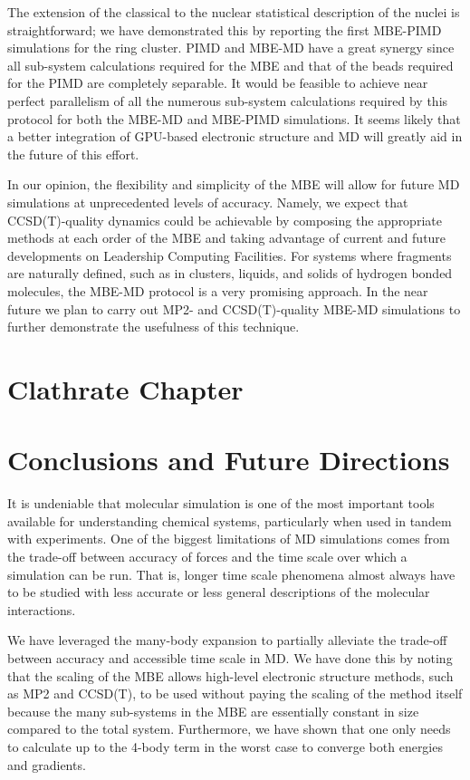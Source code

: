 \documentclass[11pt, proquest]{uwthesis}[2020/02/24]
\let\ce\ch
\begin{document}
\par The extension of the classical to the nuclear statistical description of the nuclei is straightforward; we have demonstrated this by reporting the first MBE-PIMD simulations for the ring \ce{(H2O)4} cluster. PIMD and MBE-MD have a great synergy since all sub-system calculations required for the MBE and that of the beads required for the PIMD are completely separable. It would be feasible to achieve near perfect parallelism of all the numerous sub-system calculations required by this protocol for both the MBE-MD and MBE-PIMD simulations. It seems likely that a better integration of GPU-based electronic structure and MD will greatly aid in the future of this effort.

\par In our opinion, the flexibility and simplicity of the MBE will allow for future MD simulations at unprecedented levels of accuracy. Namely, we expect that CCSD(T)-quality dynamics could be achievable by composing the appropriate methods at each order of the MBE and taking advantage of current and future developments on Leadership Computing Facilities. For systems where fragments are naturally defined, such as in clusters, liquids, and solids of hydrogen bonded molecules, the MBE-MD protocol is a very promising approach. In the near future we plan to carry out MP2- and CCSD(T)-quality MBE-MD simulations to further demonstrate the usefulness of this technique.

\chapter{Clathrate Chapter}

\chapter{Conclusions and Future Directions}

\par It is undeniable that molecular simulation is one of the most important tools available for understanding chemical systems, particularly when used in tandem with experiments. One of the biggest limitations of MD simulations comes from the trade-off between accuracy of forces and the time scale over which a simulation can be run. That is, longer time scale phenomena almost always have to be studied with less accurate or less general descriptions of the molecular interactions.

\par We have leveraged the many-body expansion to partially alleviate the trade-off between accuracy and accessible time scale in MD. We have done this by noting that the scaling of the MBE allows high-level electronic structure methods, such as MP2 and CCSD(T), to be used without paying the scaling of the method itself because the many sub-systems in the MBE are essentially constant in size compared to the total system. Furthermore, we have shown that one only needs to calculate up to the 4-body term in the worst case to converge both energies and gradients.
\end{document}
